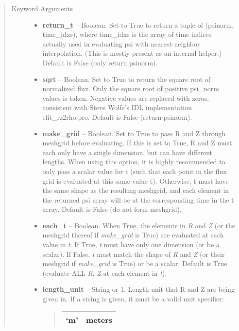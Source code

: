 \documentclass[letterpaper,10pt,english]{sphinxmanual}
\begin{document}
\begin{fulllineitems}
\begin{fulllineitems}
\begin{quote}
\begin{description}
\begin{itemize}
\end{itemize}

\item[{Keyword Arguments}] \leavevmode\begin{itemize}
\item {} 
\textbf{return\_t} --
Boolean.
Set to True to return a tuple of (psinorm,
time\_idxs), where time\_idxs is the array of time indices
actually used in evaluating psi with nearest-neighbor
interpolation. (This is mostly present as an internal helper.)
Default is False (only return psinorm).

\item {} 
\textbf{sqrt} --
Boolean.
Set to True to return the square root of normalized
flux. Only the square root of positive psi\_norm values is taken.
Negative values are replaced with zeros, consistent with Steve
Wolfe's IDL implementation efit\_rz2rho.pro. Default is False
(return psinorm).

\item {} 
\textbf{make\_grid} --
Boolean.
Set to True to pass R and Z through meshgrid
before evaluating. If this is set to True, R and Z must each
only have a single dimension, but can have different lengths.
When using this option, it is highly recommended to only pass
a scalar value for t (such that each point in the flux grid is
evaluated at this same value t). Otherwise, t must have the
same shape as the resulting meshgrid, and each element in the
returned psi array will be at the corresponding time in the t
array. Default is False (do not form meshgrid).

\item {} 
\textbf{each\_t} --
Boolean.
When True, the elements in \emph{R} and \emph{Z} (or the meshgrid thereof
if \emph{make\_grid} is True) are evaluated at each value in \emph{t}. If
True, \emph{t} must have only one dimension (or be a scalar). If
False, \emph{t} must match the shape of \emph{R} and \emph{Z} (or their
meshgrid if \emph{make\_grid} is True) or be a scalar. Default is True
(evaluate ALL \emph{R}, \emph{Z} at each element in \emph{t}).

\item {} 
\textbf{length\_unit} --
String or 1.
Length unit that R and Z are being given
in. If a string is given, it must be a valid unit specifier:
\begin{quote}

\begin{tabulary}{\linewidth}{|L|L|}
\hline

`m'
 & 
meters
\\\hline


\end{tabulary}
\end{quote}
\end{itemize}
\end{description}
\end{quote}
\end{fulllineitems}
\end{fulllineitems}
\end{document}
